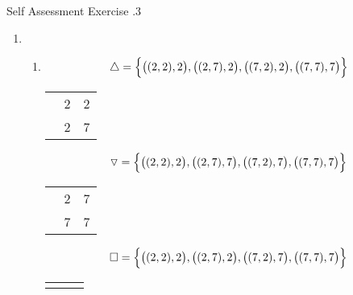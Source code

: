 \documentclass[../notes.tex]{subfiles}
\begin{document}
				\begin{exercise}{Self Assessment Exercise \thechapter.3}
					\begin{enumerate}
						\item {}
							\begin{enumerate}[label=(\alph*)]
								\item {}
									\begin{align*}
										\triangle = \Bigl\{\bigl((2, 2), 2\bigr), \bigl((2, 7), 2\bigr), \bigl((7, 2), 2\bigr), \bigl((7, 7), 7\bigr)\Bigr\}
									\end{align*}
									\begin{center}
										\begin{tabular}{|c | c c|}
											\hline
											\tablehead{$\triangle$} & \tablehead{$2$} & \tablehead{$7$}\\
											\hline
											\tablehead{$2$} & 2 & 2\\
											\tablehead{$7$} & 2 & 7\\
											\hline
										\end{tabular}
									\end{center}
									\begin{align*}
										\triangledown = \Bigl\{\bigl((2, 2), 2\bigr), \bigl((2, 7), 7\bigr), \bigl((7, 2), 7\bigr), \bigl((7, 7), 7\bigr)\Bigr\}
									\end{align*}
									\begin{center}
										\begin{tabular}{|c | c c|}
											\hline
											\tablehead{$\triangledown$} & \tablehead{$2$} & \tablehead{$7$}\\
											\hline
											\tablehead{$2$} & 2 & 7\\
											\tablehead{$7$} & 7 & 7\\
											\hline
										\end{tabular}
									\end{center}
									\begin{align*}
										\square = \Bigl\{\bigl((2, 2), 2\bigr), \bigl((2, 7), 2\bigr), \bigl((7, 2), 7\bigr), \bigl((7, 7), 7\bigr)\Bigr\}
									\end{align*}
									\begin{center}
										\begin{tabular}{|c | c c|}
											\hline
											\tablehead{$\square$} & \tablehead{$2$} & \tablehead{$7$}\\

\end{tabular}
\end{center}
\end{enumerate}
\end{enumerate}
\end{exercise}
\end{document}
